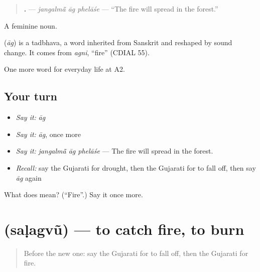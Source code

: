 \begin{quote}
\textbf{  .} — \emph{jangalmā̃ āg phelāśe} — \textquotedblleft{}The fire will spread in the forest.\textquotedblright{}
\end{quote}

A feminine noun.

\begin{cousinweb}
\textbf{} (\emph{āg}) is a tadbhava, a word inherited from Sanskrit and reshaped by sound change. It comes from \emph{agni}, \textquotedblleft{}fire\textquotedblright{} (CDIAL 55).
\end{cousinweb}

\begin{grammarlens}[title={What you've built}]
One more word for everyday life at A2.
\end{grammarlens}

\subsection*{Your turn}
\begin{itemize}
\raggedright
  \item \emph{Say it:} \emph{āg}
  \item \emph{Say it:} \emph{āg}, once more
  \item \emph{Say it:} \emph{jangalmā̃ āg phelāśe} — The fire will spread in the forest.
  \item \emph{Recall:} say the Gujarati for drought, then the Gujarati for to fall off, then say \emph{āg} again
\end{itemize}

\begin{tcolorbox}[breakable,colback=teal!4,colframe=teal!35!black,title={Before you move on}]
What does  mean? (\textquotedblleft{}Fire\textquotedblright{}.) Say it once more.
\end{tcolorbox}
\section[\texorpdfstring{\gu{સળગવું} (saḷagvũ)}{સળગવું (saḷagvũ)}]{ (saḷagvũ) — to catch fire, to burn}

\label{lesson:GU-C221-salagvu}



\begin{quote}
Before the new one: say the Gujarati for to fall off, then the Gujarati for fire.
\end{quote}

